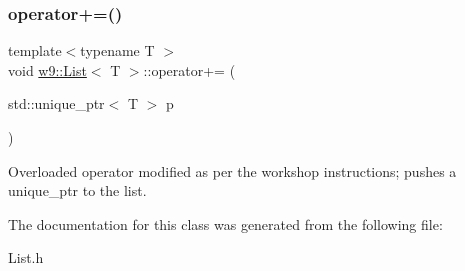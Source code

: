 \subsubsection{\texorpdfstring{operator+=()}{operator+=()}}
{\footnotesize\ttfamily template$<$typename T $>$ \\
void \mbox{\hyperlink{classw9_1_1List}{w9\+::\+List}}$<$ T $>$\+::operator+= (\begin{DoxyParamCaption}\item[{std\+::unique\+\_\+ptr$<$ T $>$}]{p }\end{DoxyParamCaption})\hspace{0.3cm}{\ttfamily [inline]}}

Overloaded operator modified as per the workshop instructions; pushes a unique\+\_\+ptr to the list. 

The documentation for this class was generated from the following file\+:\begin{DoxyCompactItemize}
\item 
List.\+h\end{DoxyCompactItemize}
